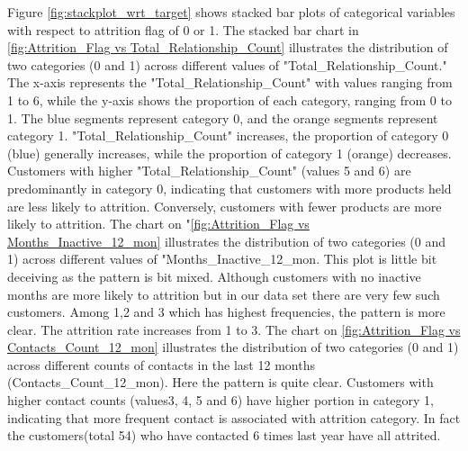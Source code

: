 \documentclass[10pt,a4paper]{style}
\begin{document}
	Figure \ref{fig:stackplot_wrt_target} shows stacked bar plots of categorical variables with respect to attrition flag of 0 or 1. The stacked bar chart in \ref{fig:Attrition_Flag vs Total_Relationship_Count} illustrates the distribution of two categories (0 and 1) across different values of "Total\_Relationship\_Count." The x-axis represents the "Total\_Relationship\_Count" with values ranging from 1 to 6, while the y-axis shows the proportion of each category, ranging from 0 to 1. The blue segments represent category 0, and the orange segments represent category 1. "Total\_Relationship\_Count" increases, the proportion of category 0 (blue) generally increases, while the proportion of category 1 (orange) decreases. Customers with higher "Total\_Relationship\_Count" (values 5 and 6) are predominantly in category 0, indicating that customers with more products held are less likely to attrition. Conversely, customers with fewer products are more likely to attrition. 
	The chart on "\ref{fig:Attrition_Flag vs Months_Inactive_12_mon} illustrates the distribution of two categories (0 and 1) across different values of "Months\_Inactive\_12\_mon. This plot  is little bit deceiving as the pattern is bit mixed. Although customers with no inactive months are more likely to attrition but in our data set there are very few such customers. Among 1,2 and 3 which has highest frequencies, the pattern is more clear. The attrition rate increases from 1 to 3. 
	The chart on \ref{fig:Attrition_Flag vs Contacts_Count_12_mon} illustrates the distribution of two categories (0 and 1) across different counts of contacts in the last 12 months (Contacts\_Count\_12\_mon). Here the pattern is quite clear. Customers with higher contact counts (values3, 4, 5 and 6) have higher portion in category 1, indicating that more frequent contact is associated with attrition category. In fact the customers(total 54) who have contacted 6 times last year have all attrited.    
\end{document}
